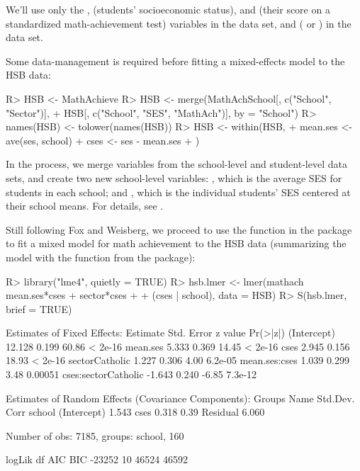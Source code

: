 \documentclass[
]{jss}
\begin{document}
We'll use only the ,  (students' socioeconomic
status), and  (their score on a standardized
math-achievement test) variables in the  data set, and
 ( or ) in the
 data set.

Some data-management is required before fitting a mixed-effects model to
the HSB data:

\begin{CodeChunk}
\begin{CodeInput}
R> HSB <- MathAchieve
R> HSB <- merge(MathAchSchool[, c("School", "Sector")],
+              HSB[, c("School", "SES", "MathAch")], by = "School")
R> names(HSB) <- tolower(names(HSB))
R> HSB <- within(HSB, {
+   mean.ses <- ave(ses, school)
+   cses <- ses - mean.ses
+ })
\end{CodeInput}
\end{CodeChunk}

In the process, we merge variables from the school-level and
student-level data sets, and create two new school-level variables:
, which is the average SES for students in each school;
and , which is the individual students' SES centered at their
school means. For details, see \citet[Sec. 7.2.2]{FoxWeisberg:2019}.

Still following Fox and Weisberg, we proceed to use the 
function in the  package \citep{BatesEtAl:2015} to fit a mixed
model for math achievement to the HSB data (summarizing the model with
the  function from the  package):

\begin{CodeChunk}
\begin{CodeInput}
R> library("lme4", quietly = TRUE)
R> hsb.lmer <- lmer(mathach ~ mean.ses*cses + sector*cses
+                    + (cses | school), data = HSB)
R> S(hsb.lmer, brief = TRUE)
\end{CodeInput}
\begin{CodeOutput}

Estimates of Fixed Effects:
                    Estimate Std. Error z value Pr(>|z|)
(Intercept)           12.128      0.199   60.86  < 2e-16
mean.ses               5.333      0.369   14.45  < 2e-16
cses                   2.945      0.156   18.93  < 2e-16
sectorCatholic         1.227      0.306    4.00  6.2e-05
mean.ses:cses          1.039      0.299    3.48  0.00051
cses:sectorCatholic   -1.643      0.240   -6.85  7.3e-12

Estimates of Random Effects (Covariance Components):
 Groups   Name        Std.Dev. Corr
 school   (Intercept) 1.543
          cses        0.318    0.39
 Residual             6.060

Number of obs: 7185, groups:  school, 160

logLik     df    AIC    BIC
-23252     10  46524  46592
\end{CodeOutput}
\end{CodeChunk}
\end{document}

